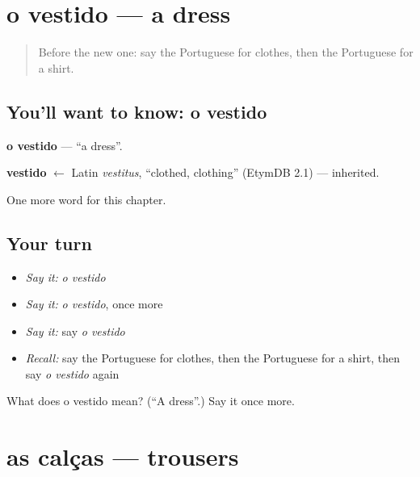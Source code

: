 \section[o vestido]{o vestido — a dress}

\label{lesson:PT-C77-vestido}



\begin{quote}
Before the new one: say the Portuguese for clothes, then the Portuguese for a shirt.
\end{quote}

\subsection*{You'll want to know: o vestido}
\textbf{o vestido} — \textquotedblleft{}a dress\textquotedblright{}.

\begin{cousinweb}
\textbf{vestido} $\leftarrow$ Latin \emph{vestitus}, \textquotedblleft{}clothed, clothing\textquotedblright{} (EtymDB 2.1) — inherited.
\end{cousinweb}

\begin{grammarlens}[title={What you've built}]
One more word for this chapter.
\end{grammarlens}

\subsection*{Your turn}
\begin{itemize}
\raggedright
  \item \emph{Say it:} \emph{o vestido}
  \item \emph{Say it:} \emph{o vestido}, once more
  \item \emph{Say it:} say \emph{o vestido}
  \item \emph{Recall:} say the Portuguese for clothes, then the Portuguese for a shirt, then say \emph{o vestido} again
\end{itemize}

\begin{tcolorbox}[breakable,colback=teal!4,colframe=teal!35!black,title={Before you move on}]
What does o vestido mean? (\textquotedblleft{}A dress\textquotedblright{}.) Say it once more.
\end{tcolorbox}
\section[as calças]{as calças — trousers}

